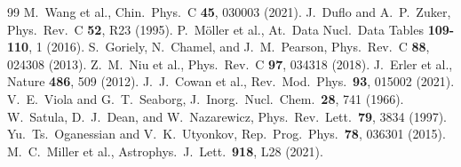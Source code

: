\documentclass[twocolumn,letterpaper,10pt]{article}
\begin{document}


\begin{thebibliography}{99}
 M.~Wang et al., Chin.\ Phys.\ C \textbf{45}, 030003 (2021).
 J.~Duflo and A.~P.~Zuker, Phys.\ Rev.\ C \textbf{52}, R23 (1995).
 P.~M\"oller et al., At.\ Data Nucl.\ Data Tables \textbf{109-110}, 1 (2016).
 S.~Goriely, N.~Chamel, and J.~M.~Pearson, Phys.\ Rev.\ C \textbf{88}, 024308 (2013).
 Z.~M.~Niu et al., Phys.\ Rev.\ C \textbf{97}, 034318 (2018).
 J.~Erler et al., Nature \textbf{486}, 509 (2012).
 J.~J.~Cowan et al., Rev.\ Mod.\ Phys.\ \textbf{93}, 015002 (2021).
 V.~E.~Viola and G.~T.~Seaborg, J.\ Inorg.\ Nucl.\ Chem.\ \textbf{28}, 741 (1966).
 W.~Satula, D.~J.~Dean, and W.~Nazarewicz, Phys.\ Rev.\ Lett.\ \textbf{79}, 3834 (1997).
 Yu.~Ts.~Oganessian and V.~K.~Utyonkov, Rep.\ Prog.\ Phys.\ \textbf{78}, 036301 (2015).
 M.~C.~Miller et al., Astrophys.\ J.\ Lett.\ \textbf{918}, L28 (2021).
\end{thebibliography}
\end{document}
